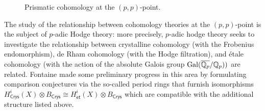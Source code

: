 \begin{figure}[H]
\begin{center}
    \end{center}
    \caption{Prismatic cohomology at the $(p,p)$-point.}
\end{figure}
The study of the relationship between cohomology theories at the $(p,p)$-point is the subject of $p$-adic Hodge theory: more precisely, $p$-adic hodge theory seeks to investigate the relationship between crystalline cohomology (with the Frobenius endomorphism), de Rham cohomology (with the Hodge filtration), and \'{e}tale cohomology (with the action of the absolute Galois group $\mathrm{Gal}(\overline{\mathbb{Q}_{p}}/\mathbb{Q}_{p}))$ are related. Fontaine made some preliminary progress in this area by formulating comparison conjectures via the so-called period rings that furnish isomorphisms $H^{i}_{\mathsf{Crys}}(X)\otimes B_{\mathsf{Crys}}\cong H^{i}_{\mathsf{\acute{e}t}}(X)\otimes B_{\mathsf{Crys}}$ which are compatible with the additional structure listed above. 

